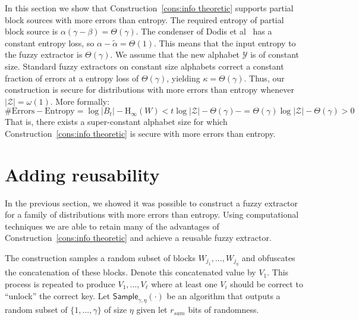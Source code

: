 \documentclass[11pt]{article}
\newcommand{\consref}[1]{\mbox{Construction~\ref{#1}}}
\newcommand{\class}[1]{{\ensuremath{\mathsf{#1}}}}
\newcommand{\sample}{\ensuremath{\class{Sample}}\xspace}
\newcommand{\Hoo}{\mathrm{H}_\infty}
\begin{document}
In this section we show that \consref{cons:info theoretic} supports partial block sources with more errors than entropy.  The required entropy of partial block source is $\alpha (\gamma-\beta ) = \Theta(\gamma)$.  The condenser of Dodis et al~\cite{dodis2014key} has a constant entropy loss, so $\alpha-\tilde{\alpha} = \Theta(1)$. This means that the input entropy to the fuzzy extractor is $\Theta(\gamma)$.   We assume that the new alphabet $\mathcal{Y}$ is of constant size.  Standard fuzzy extractors on constant size alphabets correct a constant fraction of errors at a entropy loss of $\Theta(\gamma)$, yielding $\kappa = \Theta(\gamma)$.  Thus, our construction is secure for distributions with more errors than entropy whenever $|\mathcal{Z}| = \omega(1)$.
More formally:
\[
\text{\# Errors} - \text{Entropy} = \log |B_t| - \Hoo(W) <  t \log |\mathcal{Z}| - \Theta(\gamma)-= \Theta(\gamma) \log |\mathcal{Z}| - \Theta(\gamma)  > 0
\]
That is, there exists a super-constant alphabet size for which \consref{cons:info theoretic} is secure with more errors than entropy.

\section{Adding reusability}
\label{sec:sampling}
In the previous section, we showed it was possible to construct a fuzzy extractor for a family of distributions with more errors than entropy.  Using computational techniques we are able to retain many of the advantages of \consref{cons:info theoretic} and achieve a reusable fuzzy extractor.

The construction samples a random subset of blocks $W_{j_1},..., W_{j_\eta}$ and obfuscates the concatenation of these blocks.  Denote this concatenated value by $V_1$.  This process is repeated to produce $V_1,..., V_\ell$ where at least one $V_i$ should be correct to ``unlock'' the correct key.
Let $\sample_{\gamma, \eta}(\cdot)$ be an algorithm that  outputs a random subset of $\{1,..., \gamma\}$ of size $\eta$ given let $r_{sam}$ bits of randomness.
\end{document}
